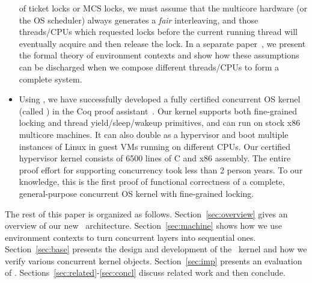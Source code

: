\begin{itemize}[leftmargin=*]
  of ticket locks or MCS locks, we must assume that the multicore
  hardware (or the OS scheduler) always generates a {\em fair}
  interleaving, and those threads/CPUs which requested locks before
  the current running thread will eventually acquire and then release
  the lock. In a separate paper~\cite{ccal16}, we present the formal
  theory of environment contexts and show how these assumptions
  can be discharged when we compose different threads/CPUs to form
  a complete system.
\item Using \CTOS, we have successfully developed a fully certified
  concurrent OS kernel (called \mCTOS) in the Coq proof
  assistant~\cite{coq}. Our kernel supports both fine-grained locking
  and thread yield/sleep/wakeup primitives, and can run on stock x86
  multicore machines. It can also double as a hypervisor and boot
  multiple instances of Linux in guest VMs running on different CPUs.
  Our certified hypervisor kernel consists of 6500 lines of C and x86
  assembly. The entire proof effort for supporting
  concurrency took less than 2 person years. To our knowledge, this
  is the first proof of functional correctness of a complete,
  general-purpose concurrent OS kernel with fine-grained locking.
\end{itemize}

The rest of this paper is organized as follows.
Section~\ref{sec:overview} gives an overview of our new
\CTOS\ architecture. Section~\ref{sec:machine} shows how we use
environment contexts to turn concurrent layers into sequential ones.
Section~\ref{sec:base} presents the design and development of the
\mCTOS\ kernel and how we verify various concurrent kernel
objects. Section~\ref{sec:imp} presents an evaluation of \CTOS.
Sections~\ref{sec:related}-\ref{sec:concl} discuss related work and
then conclude.














